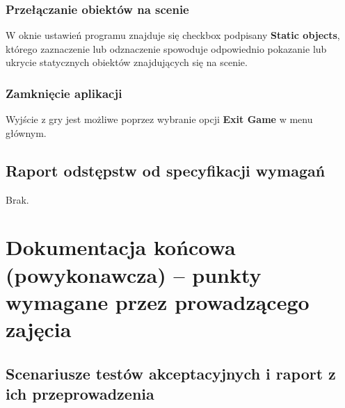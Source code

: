 \documentclass[10pt,a4paper]{article}
\begin{document}
\subsubsection{Przełączanie obiektów na scenie}
W oknie ustawień programu znajduje się checkbox podpisany \textbf{Static objects}, którego zaznaczenie lub odznaczenie spowoduje odpowiednio pokazanie lub ukrycie statycznych obiektów znajdujących się na scenie.

\subsubsection{Zamknięcie aplikacji}
Wyjście z gry jest możliwe poprzez wybranie opcji \textbf{Exit Game} w menu głównym.

\subsection{Raport odstępstw od specyfikacji wymagań}
Brak.

\section{Dokumentacja końcowa (powykonawcza) -- punkty wymagane przez prowadzącego zajęcia}

\subsection{Scenariusze testów akceptacyjnych i raport z ich przeprowadzenia}
\end{document}
